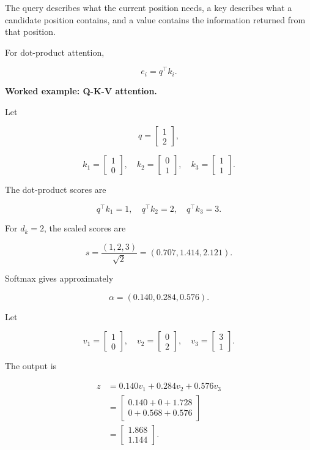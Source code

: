 \documentclass[11pt,a4paper,twoside]{article}
\begin{document}
The query describes what the current position needs, a key describes what a candidate position contains, and a value contains the information returned from that position.

For dot-product attention,

\[
e_i=q^\top k_i.
\]

\textbf{Worked example: Q-K-V attention.}

Let

\[
q=\begin{bmatrix}1\\2\end{bmatrix},
\]

\[
k_1=\begin{bmatrix}1\\0\end{bmatrix},
\quad
k_2=\begin{bmatrix}0\\1\end{bmatrix},
\quad
k_3=\begin{bmatrix}1\\1\end{bmatrix}.
\]

The dot-product scores are

\[
q^\top k_1=1,
\quad q^\top k_2=2,
\quad q^\top k_3=3.
\]

For $d_k=2$, the scaled scores are

\[
s=\frac{(1,2,3)}{\sqrt2}
=(0.707,1.414,2.121).
\]

Softmax gives approximately

\[
\alpha=(0.140,0.284,0.576).
\]

Let

\[
v_1=\begin{bmatrix}1\\0\end{bmatrix},
\quad
v_2=\begin{bmatrix}0\\2\end{bmatrix},
\quad
v_3=\begin{bmatrix}3\\1\end{bmatrix}.
\]

The output is

\[
\begin{aligned}
z
&=0.140v_1+0.284v_2+0.576v_3\\
&=
\begin{bmatrix}
0.140+0+1.728\\
0+0.568+0.576
\end{bmatrix}\\
&=
\begin{bmatrix}
1.868\\1.144
\end{bmatrix}.
\end{aligned}
\]
\end{document}
